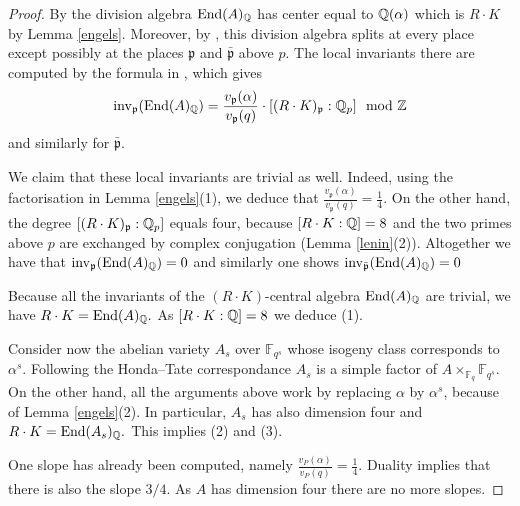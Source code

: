 \begin{proof}
By \cite{Tate} the division algebra $ \textnormal{End} (A)_{\mathbb{Q}}$ has center equal to $\mathbb{Q}(\alpha)$ which is  $R\cdot K$ by Lemma \ref{engels}. Moreover, by \cite[Theorem 1]{TateBour}, this division algebra  splits at every place except possibly at  the places $\mathfrak{p}$ and $\bar{\mathfrak{p}}$ above $p$. The local invariants there are computed by the formula in \cite[Theorem 1]{TateBour}, which gives
\[\mathrm{inv}_\mathfrak{p}( \textnormal{End} (A)_{\mathbb{Q}})=\frac{v_\mathfrak{p}(\alpha)}{v_\mathfrak{p}(q)}\cdot [(R\cdot K)_\mathfrak{p}:\mathbb{Q}_p]  \mod {\mathbb{Z}}\]
and similarly for $\bar{\mathfrak{p}}$.

We claim that these local invariants are trivial as well. Indeed, using the factorisation in Lemma \ref{engels}(1), we deduce that $\frac{v_\mathfrak{p}(\alpha)}{v_\mathfrak{p}(q)}=\frac{1}{4}.$ On the other hand, the degree $[(R\cdot K)_\mathfrak{p}:\mathbb{Q}_p]$ equals four, because  $[R\cdot K:\mathbb{Q}]=8$ and the two primes above $p$ are exchanged by  complex conjugation (Lemma \ref{lenin}(2)). Altogether we have that $\mathrm{inv}_\mathfrak{p}( \textnormal{End} (A)_{\mathbb{Q}})=0$ and similarly one shows $\mathrm{inv}_{\bar{\mathfrak{p}}}( \textnormal{End} (A)_{\mathbb{Q}})=0$

Because all the invariants of the $(R\cdot K)$-central algebra $ \textnormal{End} (A)_{\mathbb{Q}}$ are trivial, we have
$R\cdot K= \textnormal{End} (A)_{\mathbb{Q}}.$  As ${[R\cdot K:\mathbb{Q}]=8}$  we deduce (1).

Consider now the abelian variety $A_s$  over $\mathbb{F}_{q^s}$ whose isogeny class  corresponds to $\alpha^s$. Following the Honda--Tate correspondance $A_s$ is a simple factor of $A \times_{\mathbb{F}_q} \mathbb{F}_{q^s} $. On the other hand, all the arguments above work  by replacing $\alpha$ by  $\alpha^s$, because of  Lemma \ref{engels}(2). In particular, $A_s$  has also dimension four and $R\cdot K= \textnormal{End} (A_s)_{\mathbb{Q}}.$ This implies (2) and (3).

One slope has already been computed, namely $\frac{v_P(\alpha)}{v_P(q)}=\frac{1}{4}.$ Duality implies that there is also the slope $3/4$. As $A$ has dimension four there are no more slopes.


\end{proof}

